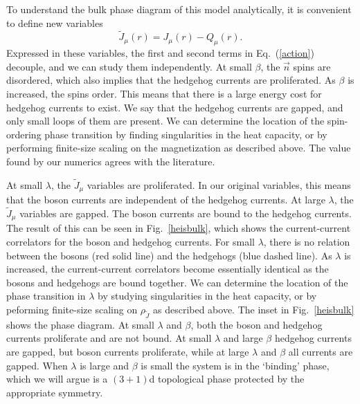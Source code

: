 \documentclass[prb,twocolumn]{revtex4-1}
\begin{document}
To understand the bulk phase diagram of this model analytically, it is convenient to define new variables
\begin{equation}
\tilde J_\mu(r)=J_\mu(r)-Q_\mu(r).
\label{shift}
\end{equation}
Expressed in these variables, the first and second terms in Eq.~(\ref{action}) decouple, and we can study them independently. 
At small $\beta$, the $\vec{n}$ spins are disordered, which also implies that the hedgehog currents are proliferated. As $\beta$ is increased, the spins order. This means that there is a large energy cost for hedgehog currents to exist. We say that the hedgehog currents are gapped, and only small loops of them are present. We can determine the location of the spin-ordering phase transition by finding singularities in the heat capacity, or by performing finite-size scaling on the magnetization as described above. The value found by our numerics agrees with the literature.\cite{McKenzie2}

At small $\lambda$, the $\tilde J_\mu$ variables are proliferated. In our original variables, this means that the boson currents are independent of the hedgehog currents. At large $\lambda$, the $\tilde J_\mu$ variables are gapped. The boson currents are bound to the hedgehog currents. The result of this can be seen in Fig.~\ref{heisbulk}, which shows the current-current correlators for the boson and hedgehog currents. For small $\lambda$, there is no relation between the bosons (red solid line) and the hedgehogs (blue dashed line). As $\lambda$ is increased, the current-current correlators become essentially identical as the bosons and hedgehogs are bound together. We can determine the location of the phase transition in $\lambda$ by studying singularities in the heat capacity, or by peforming finite-size scaling on $\rho_{\tilde J}$ as described above. The inset in Fig.~\ref{heisbulk} shows the phase diagram. At small $\lambda$ and $\beta$, both the boson and hedgehog currents proliferate and are not bound. At small $\lambda$ and large $\beta$ hedgehog currents are gapped, but boson currents proliferate, while at large $\lambda$ and $\beta$ all currents are gapped. When $\lambda$ is large and $\beta$ is small the system is in the `binding' phase, which we will argue is a $(3+1)$d topological phase protected by the appropriate symmetry.
\end{document}
